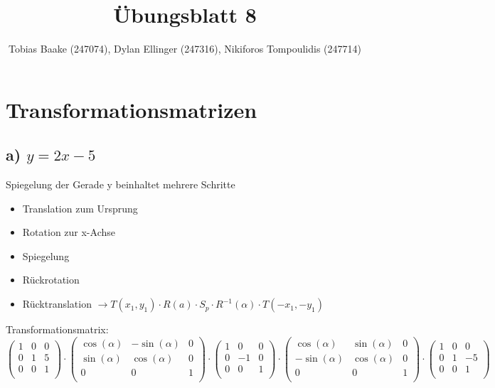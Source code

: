\documentclass{article}
\title{Übungsblatt 8}
\author{Tobias Baake (247074), Dylan Ellinger (247316), Nikiforos Tompoulidis (247714)}
\begin{document}
\maketitle

\section{Transformationsmatrizen}
\subsection*{a) $y= 2x-5$}

Spiegelung der Gerade y beinhaltet mehrere Schritte
\begin{itemize}
    \item Translation zum Ursprung
    \item Rotation zur x-Achse
    \item Spiegelung
    \item Rückrotation
    \item Rücktranslation $\rightarrow T(x_1, y_1) \cdot R(a) \cdot S_p \cdot R^{-1}(\alpha) \cdot T(-x_1, -y_1)$
\end{itemize}

Transformationsmatrix:
$$
\begin{pmatrix}
    1 & 0 & 0 \\
    0 & 1 & 5 \\
    0 & 0 & 1 \\
\end{pmatrix}
\cdot
\begin{pmatrix}
    \cos(\alpha) & -\sin(\alpha) & 0 \\
    \sin(\alpha) & \cos(\alpha) & 0 \\
    0 & 0 & 1 \\
\end{pmatrix}
\cdot
\begin{pmatrix}
    1 & 0 & 0 \\
    0 & -1 & 0 \\
    0 & 0 & 1 \\
\end{pmatrix}
\cdot
\begin{pmatrix}
    \cos(\alpha) & \sin(\alpha) & 0 \\
    -\sin(\alpha) & \cos(\alpha) & 0 \\
    0 & 0 & 1 \\
\end{pmatrix}
\cdot
\begin{pmatrix}
    1 & 0 & 0 \\
    0 & 1 & -5 \\
    0 & 0 & 1 \\
\end{pmatrix}
$$
\end{document}
